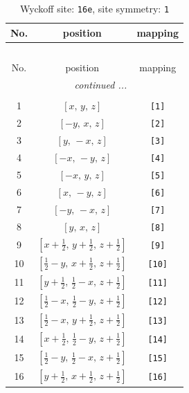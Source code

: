 \documentclass[fleqn,8pt]{jsarticle}
\begin{document}
\begin{longtable}{ccc}
\caption{Wyckoff site: {\tt 16e}, site symmetry: {\tt 1}}
 \\
 \hline \hline
No. & position & mapping \\ \hline \endfirsthead

\multicolumn{2}{l}{\tablename\ \thetable{}} \\
 \hline \hline
No. & position & mapping \\ \hline \endhead

 \hline \hline
\multicolumn{2}{r}{\footnotesize\it continued ...} \\ \endfoot

 \hline \hline
\multicolumn{2}{r}{} \\ \endlastfoot

1 & $\left[ x,\, y,\, z \right]$ & {\tt [1]} \\ \hline
2 & $\left[ - y,\, x,\, z \right]$ & {\tt [2]} \\ \hline
3 & $\left[ y,\, - x,\, z \right]$ & {\tt [3]} \\ \hline
4 & $\left[ - x,\, - y,\, z \right]$ & {\tt [4]} \\ \hline
5 & $\left[ - x,\, y,\, z \right]$ & {\tt [5]} \\ \hline
6 & $\left[ x,\, - y,\, z \right]$ & {\tt [6]} \\ \hline
7 & $\left[ - y,\, - x,\, z \right]$ & {\tt [7]} \\ \hline
8 & $\left[ y,\, x,\, z \right]$ & {\tt [8]} \\ \hline
9 & $\left[ x + \frac{1}{2},\, y + \frac{1}{2},\, z + \frac{1}{2} \right]$ & {\tt [9]} \\ \hline
10 & $\left[ \frac{1}{2} - y,\, x + \frac{1}{2},\, z + \frac{1}{2} \right]$ & {\tt [10]} \\ \hline
11 & $\left[ y + \frac{1}{2},\, \frac{1}{2} - x,\, z + \frac{1}{2} \right]$ & {\tt [11]} \\ \hline
12 & $\left[ \frac{1}{2} - x,\, \frac{1}{2} - y,\, z + \frac{1}{2} \right]$ & {\tt [12]} \\ \hline
13 & $\left[ \frac{1}{2} - x,\, y + \frac{1}{2},\, z + \frac{1}{2} \right]$ & {\tt [13]} \\ \hline
14 & $\left[ x + \frac{1}{2},\, \frac{1}{2} - y,\, z + \frac{1}{2} \right]$ & {\tt [14]} \\ \hline
15 & $\left[ \frac{1}{2} - y,\, \frac{1}{2} - x,\, z + \frac{1}{2} \right]$ & {\tt [15]} \\ \hline
16 & $\left[ y + \frac{1}{2},\, x + \frac{1}{2},\, z + \frac{1}{2} \right]$ & {\tt [16]} \\
\end{longtable}
\end{document}
